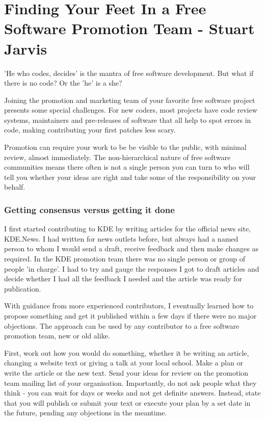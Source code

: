 \chapter{Finding Your Feet In a Free Software Promotion Team - Stuart Jarvis}
'He who codes, decides' is the mantra of free software development. But what if there is no code? Or the 'he' is a she?

Joining the promotion and marketing team of your favorite free software project presents some special challenges. For new coders, most projects have code review systems, maintainers and pre-releases of software that all help to spot errors in code, making contributing your first patches less scary. 

Promotion can require your work to be be visible to the public, with minimal review, almost immediately. The non-hierarchical nature of free software communities means there often is not a single person you can turn to who will tell you whether your ideas are right and take some of the responsibility on your behalf.

\subsection*{Getting consensus versus getting it done}

I first started contributing to KDE by writing articles for the official news site, KDE.News. I had written for news outlets before, but always had a named person to whom I would send a draft, receive feedback and then make changes as required. In the KDE promotion team there was no single person or group of people 'in charge'. I had to try and gauge the responses I got to draft articles and decide whether I had all the feedback I needed and the article was ready for publication.

With guidance from more experienced contributors, I eventually learned how to propose something and get it published within a few days if there were no major objections. The approach can be used by any contributor to a free software promotion team, new or old alike.

First, work out how you would do something, whether it be writing an article, changing a website text or giving a talk at your local school. Make a plan or write the article or the new text. Send your ideas for review on the promotion team mailing list of your organisation. Importantly, do not ask people what they think - you can wait for days or weeks and not get definite answers. Instead, state that you will publish or submit your text or execute your plan by a set date in the future, pending any objections in the meantime.

